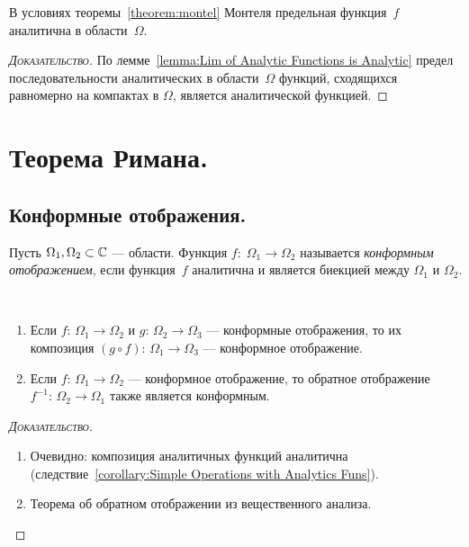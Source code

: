 \documentclass[../complex-analysis.tex]{subfiles}
\begin{document}
\begin{remrk}
 \label{remark:Montel Theorem Analytic Limit}
 В условиях теоремы~\ref{theorem:montel} Монтеля предельная функция~$ f $ аналитична в области~$ \Omega $.
\end{remrk}
\begin{proof}[\normalfont\textsc{Доказательство}]
 По лемме~\ref{lemma:Lim of Analytic Functions is Analytic} предел последовательности аналитических в области~$ \Omega $ функций, сходящихся равномерно на компактах в $ \Omega $, является аналитической функцией.
\end{proof}

\newpage
\section{Теорема Римана.}

\subsection{Конформные отображения.}

\begin{df}
 Пусть $ \Omega_1, \Omega_2 \subset \mathbb{C} $ --- области. Функция $ f \colon\; \Omega_1 \to \Omega_2 $ называется \emph{конформным отображением}, если функция~$ f $ аналитична и является биекцией между $ \Omega_1 $  и $ \Omega_2 $.
\end{df}

\begin{prop}\
 \label{proposition:conformal_map_group_properties}
 \begin{enumerate}
  \item Если $ f\colon\,\Omega_1 \to \Omega_2 $ и $ g\colon\,\Omega_2\to\Omega_3 $ --- конформные отображения, то их композиция $ (g \circ f) \colon\,\Omega_1 \to \Omega_3 $ --- конформное отображение.
  \item Если $ f \colon\,\Omega_1 \to \Omega_2 $ --- конформное отображение, то обратное отображение $ f^{-1}\colon\,\Omega_2\to\Omega_1 $ также является конформным.
 \end{enumerate}
\end{prop}
\begin{proof}[\normalfont\textsc{Доказательство}]\
 \begin{enumerate}
  \item Очевидно: композиция аналитичных функций аналитична (следствие~\ref{corollary:Simple Operations with Analytics Funs}).
  \item Теорема об обратном отображении из вещественного анализа.
 \end{enumerate}
\end{proof}
\end{document}

